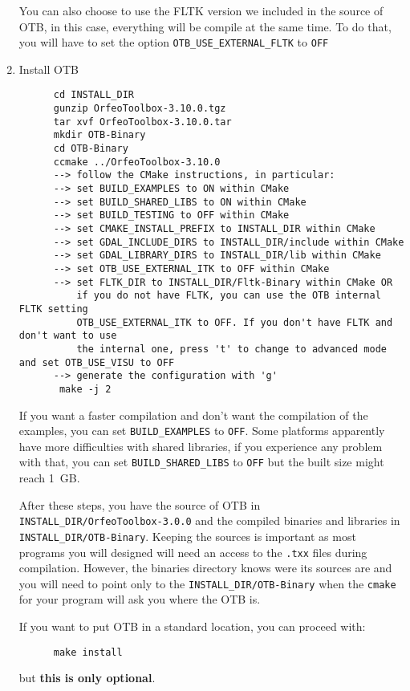 \begin{enumerate}
   You can also choose to use the FLTK version we included in the source of OTB, in this case, everything will be compile at the same time. To do that, you will have to set the option \texttt{OTB\_USE\_EXTERNAL\_FLTK} to \texttt{OFF}

\item Install OTB
  \begin{verbatim}
      cd INSTALL_DIR
      gunzip OrfeoToolbox-3.10.0.tgz
      tar xvf OrfeoToolbox-3.10.0.tar
      mkdir OTB-Binary
      cd OTB-Binary
      ccmake ../OrfeoToolbox-3.10.0
      --> follow the CMake instructions, in particular:
	  --> set BUILD_EXAMPLES to ON within CMake
	  --> set BUILD_SHARED_LIBS to ON within CMake
	  --> set BUILD_TESTING to OFF within CMake
	  --> set CMAKE_INSTALL_PREFIX to INSTALL_DIR within CMake
	  --> set GDAL_INCLUDE_DIRS to INSTALL_DIR/include within CMake
	  --> set GDAL_LIBRARY_DIRS to INSTALL_DIR/lib within CMake
	  --> set OTB_USE_EXTERNAL_ITK to OFF within CMake
	  --> set FLTK_DIR to INSTALL_DIR/Fltk-Binary within CMake OR
	      if you do not have FLTK, you can use the OTB internal FLTK setting  
	      OTB_USE_EXTERNAL_ITK to OFF. If you don't have FLTK and don't want to use 
	      the internal one, press 't' to change to advanced mode and set OTB_USE_VISU to OFF
	  --> generate the configuration with 'g'
       make -j 2
  \end{verbatim}

  If you want a faster compilation and don't want the compilation of the examples, you
  can set \texttt{BUILD\_EXAMPLES} to \texttt{OFF}. Some platforms apparently
  have more difficulties with shared libraries, if you experience any problem
  with that, you can set \texttt{BUILD\_SHARED\_LIBS} to \texttt{OFF} but the
  built size might reach 1~GB.

  After these steps, you have the source of OTB in \texttt{INSTALL\_DIR/OrfeoToolbox-3.0.0}
  and the compiled binaries and libraries in \texttt{INSTALL\_DIR/OTB-Binary}. Keeping
  the sources is important as most programs you will designed will need an access
  to the \texttt{.txx} files during compilation. However, the binaries directory knows were
  its sources are and you will need to point only to the \texttt{INSTALL\_DIR/OTB-Binary}
  when the \texttt{cmake} for your program will ask you where the OTB is.

  If you want to put OTB in a standard location, you can proceed with:

  \begin{verbatim}
      make install
  \end{verbatim}

  but \textbf{this is only optional}.


\end{enumerate}

